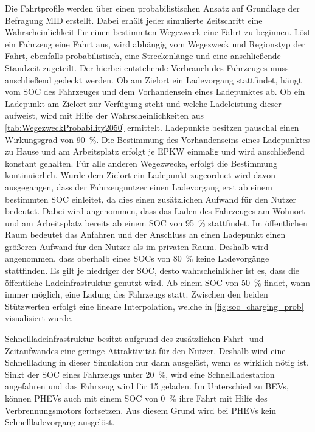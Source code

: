 Die Fahrtprofile werden über einen probabilistischen Ansatz auf Grundlage der Befragung \gls{MID} erstellt.
Dabei erhält jeder simulierte Zeitschritt eine Wahrscheinlichkeit für einen bestimmten Wegezweck eine Fahrt zu beginnen.
Löst ein Fahrzeug eine Fahrt aus, wird abhängig vom Wegezweck und Regionstyp der Fahrt, ebenfalls probabilistisch, eine Streckenlänge und eine anschließende Standzeit zugeteilt.
Der hierbei entstehende Verbrauch des Fahrzeuges muss anschließend gedeckt werden.
Ob am Zielort ein Ladevorgang stattfindet, hängt vom \gls{SOC} des Fahrzeuges und dem Vorhandensein eines Ladepunktes ab.
Ob ein Ladepunkt am Zielort zur Verfügung steht und welche Ladeleistung dieser aufweist, wird mit Hilfe der Wahrscheinlichkeiten aus \autoref{tab:WegezweckProbability2050} ermittelt.
Ladepunkte besitzen pauschal einen Wirkungsgrad von \SI{90}{\percent}. \cite{EliaGroup2020}
Die Bestimmung des Vorhandenseins eines Ladepunktes zu Hause und am Arbeitsplatz erfolgt je \gls{EPKW} einmalig und wird anschließend konstant gehalten.
Für alle anderen Wegezwecke, erfolgt die Bestimmung kontinuierlich.
Wurde dem Zielort ein Ladepunkt zugeordnet wird davon ausgegangen, dass der Fahrzeugnutzer einen Ladevorgang erst ab einem bestimmten \gls{SOC} einleitet, da dies einen zusätzlichen Aufwand für den Nutzer bedeutet.
Dabei wird angenommen, dass das Laden des Fahrzeuges am Wohnort und am Arbeitsplatz bereits ab einem \gls{SOC} von \SI{95}{\percent} stattfindet.
Im öffentlichen Raum bedeutet das Anfahren und der Anschluss an einen Ladepunkt einen größeren Aufwand für den Nutzer als im privaten Raum.
Deshalb wird angenommen, dass oberhalb eines \glspl{SOC} von \SI{80}{\percent} keine Ladevorgänge stattfinden.
Es gilt je niedriger der \gls{SOC}, desto wahrscheinlicher ist es, dass die öffentliche Ladeinfrastruktur genutzt wird.
Ab einem \gls{SOC} von \SI{50}{\percent} findet, wann immer möglich, eine Ladung des Fahrzeugs statt.
Zwischen den beiden Stützwerten erfolgt eine lineare Interpolation, welche in \autoref{fig:soc_charging_prob} visualisiert wurde.



Schnellladeinfrastruktur besitzt aufgrund des zusätzlichen Fahrt- und Zeitaufwandes eine geringe Attraktivität für den Nutzer.
Deshalb wird eine Schnellladung in dieser Simulation nur dann ausgelöst, wenn es wirklich nötig ist.
Sinkt der \gls{SOC} eines Fahrzeugs unter \SI{20}{\percent}, wird eine Schnellladestation angefahren und das Fahrzeug wird für \SI{15}{\Minuten} geladen.
Im Unterschied zu \glspl{BEV}, können \glspl{PHEV} auch mit einem \gls{SOC} von \SI{0}{\percent} ihre Fahrt mit Hilfe des Verbrennungsmotors fortsetzen.
Aus diesem Grund wird bei \glspl{PHEV} kein Schnellladevorgang ausgelöst.\medskip

